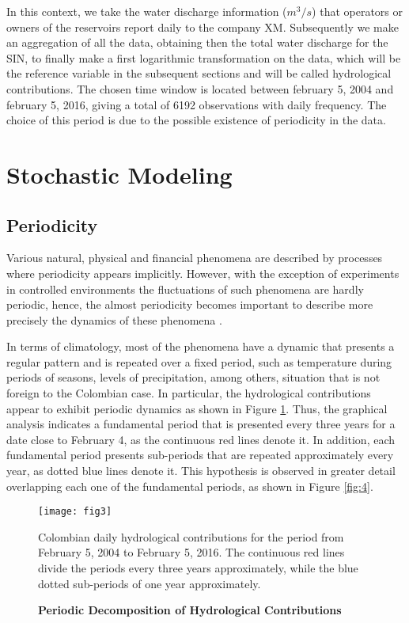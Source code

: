 \documentclass[12pt,halfline,a4paper]{ouparticle}
\begin{document}
In this context, we take the water discharge information ($m^{3}/s$) that operators or owners of the reservoirs report daily to the company XM. Subsequently we make an aggregation of all the data, obtaining then the total water discharge for the SIN, to finally make a first logarithmic transformation on the data, which will be the reference variable in the subsequent sections and will be called hydrological contributions. The chosen time window is located between february 5, 2004 and february 5, 2016, giving a total of 6192 observations with daily frequency. The choice of this period is due to the possible existence of periodicity in the data.

\section{Stochastic Modeling}\label{textural}

\subsection{Periodicity}

Various natural, physical and financial phenomena are described by processes where periodicity appears implicitly. However, with the exception of experiments in controlled environments the fluctuations of such phenomena are hardly periodic, hence, the almost periodicity becomes important to describe more precisely the dynamics of these phenomena \citep{Bezandry2011,Diagana2007}.

In terms of climatology, most of the phenomena have a dynamic that presents a regular pattern and is repeated over a fixed period, such as temperature during periods of seasons, levels of precipitation, among others, situation that is not foreign to the Colombian case. In particular, the hydrological  contributions appear to exhibit periodic dynamics as shown in Figure \ref{fig:3}. Thus, the graphical analysis indicates a fundamental period that is presented every three years for a date close to February 4, as the continuous red lines denote it. In addition, each fundamental period presents sub-periods that are repeated approximately every year, as dotted blue lines denote it. This hypothesis is observed in greater detail overlapping each one of the fundamental periods, as shown in Figure \ref{fig:4}.


\begin{figure}[h]
	\centering
	\texttt{[image: fig3]}
	\caption{\textbf{Periodic Decomposition of Hydrological Contributions}}
	\medskip
	\begin{minipage}{0.8\textwidth} 
		{\footnotesize{Colombian daily hydrological contributions for the period from February 5, 2004 to February 5, 2016. The continuous red lines divide the periods every three years approximately, while the blue dotted sub-periods of one year approximately.\par}}
	\end{minipage}
	\label{fig:3}
\end{figure}
\end{document}
